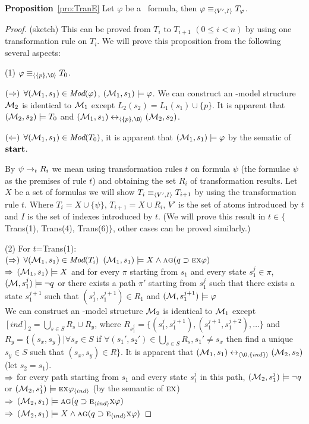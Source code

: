 \documentclass{article}
\begin{document}
\textbf{Proposition}~\ref{pro:TranE}
 Let $\varphi$ be a \CTL\ formula, then $\varphi \equiv_{{\langle{V', I}\rangle}} T_{\varphi}$.
\begin{proof} (sketch)
This can be proved from $T_i$ to $T_{i+1}$ $(0\leq i < n)$ by using one transformation rule on $T_i$.
We will prove this proposition from the following several aspects:

(1) $\varphi \equiv_{\tuple{\{p\}, {\O}}} T_0$.

$(\Rightarrow)$ $\forall ({\cal M}_1,s_1) \in \textit{Mod}(\varphi)$, \ie $({\cal M}_1,s_1) \models \varphi$. We can construct an \Ind-model structure ${\cal M}_2$ is identical to ${\cal M}_1$ except $L_2(s_2) = L_1(s_1) \cup \{p\}$. It is apparent that $({\cal M}_2,s_2) \models T_0$ and $(\Hm_1, s_1) \lrto_{\tuple{\{p\}, {\O}}} (\Hm_2, s_2)$.

$(\Leftarrow)$ $\forall ({\cal M}_1,s_1) \in \textit{Mod}(T_0)$, it is apparent that $({\cal M}_1,s_1) \models \varphi$ by the sematic of $\textbf{start}$.

By $\psi \rightarrow_t R_i$ we mean using transformation rules $t$ on formula $\psi$ (the formulae $\psi$ as the
premises of rule $t$) and obtaining the set  $R_i$ of transformation results. Let $X$ be a set of formulas
we will show $T_i \equiv_{{\langle{V',I}\rangle}} T_{i+1}$ by using the transformation rule $t$. Where $T_i= X \cup \{\psi\}$, $T_{i+1}=X \cup R_i$, $V'$ is the set of atoms introduced by $t$ and $I$ is the set of indexes introduced by $t$. (We will prove this result in $t\in \{$Trans(1), Trans(4), Trans(6)$\}$, other cases can be proved similarly.)

(2) For $t$=Trans(1):\\
$(\Rightarrow)$ $\forall ({\cal M}_1,s_1) \in \textit{Mod}(T_i)$ \ie $({\cal M}_1, s_1) \models X \wedge \textsc{a}\textsc{g}(q \supset \textsc{e} \textsc{x} \varphi)$\\
$\Rightarrow$ $({\cal M}_1,s_1)\models X$ and for every $\pi$ starting from $s_1$ and every state $s_1^j \in \pi$, $({\cal M},s_1^j) \models \neg q$ or there exists a path $\pi'$ starting from $s_1^j$ such that there exists a state $s_1^{j+1}$ such that $(s_1^j,s_1^{j+1})\in R_1$ and $({\cal M},s_1^{j+1})\models \varphi$\\
We can construct an \Ind-model structure ${\cal M}_2$ is identical to ${\cal M}_1$ except  $[ind]_2= \bigcup_{s\in S} R_s \cup R_y$, where $R_{s_1^{j}}=\{(s_1^{j},s_1^{j+1}), (s_1^{j+1}, s_1^{j+2}),\dots\}$ and $R_y=\{(s_x,s_y)| \forall s_x \in S$ if $\forall (s_1',s_2')\in \bigcup_{s\in S} R_s, s_1'\neq s_x$ then find a unique $s_y\in S$ such that $(s_x,s_y)\in R\}$. It is apparent that $(\Hm_1, s_1) \lrto_{\tuple{{\O}, \{ind\}}} (\Hm_2, s_2)$ (let $s_2=s_1$).\\
$\Rightarrow$ for every path starting from $s_1$ and every state $s_1^j$ in this path, $({\cal M}_2, s_1^j) \models \neg q$ or $({\cal M}_2, s_1^j)\models \textsc{e} \textsc{x} \varphi_{{\langle{ind}\rangle}}$ \hfill (by the semantic of $\textsc{e} \textsc{x}$)\\
$\Rightarrow$ $({\cal M}_2, s_1) \models \textsc{a} \textsc{g}(q \supset \textsc{e}_{{\langle{ind}\rangle}} \textsc{x} \varphi )$\\
$\Rightarrow$ $({\cal M}_2, s_1) \models X \wedge \textsc{a} \textsc{g}(q \supset \textsc{e}_{{\langle{ind}\rangle}} \textsc{x} \varphi )$


\end{proof}
\end{document}
